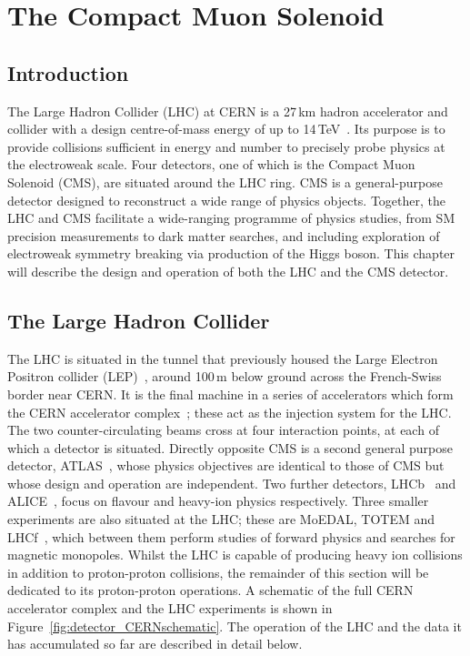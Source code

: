 \chapter{The Compact Muon Solenoid}
\label{chap:detector}

\section{Introduction}

The Large Hadron Collider (LHC) at CERN is a 27\,km hadron accelerator and collider with a design centre-of-mass energy of up to 14\,TeV~\cite{LHC}.
Its purpose is to provide collisions sufficient in energy and number to precisely probe physics at the electroweak scale.
Four detectors, one of which is the Compact Muon Solenoid (CMS), are situated around the LHC ring.
CMS is a general-purpose detector designed to reconstruct a wide range of physics objects.
Together, the LHC and CMS facilitate a wide-ranging programme of physics studies, from SM precision measurements to dark matter searches, 
and including exploration of electroweak symmetry breaking via production of the Higgs boson.
This chapter will describe the design and operation of both the LHC and the CMS detector.

\section{The Large Hadron Collider}

The LHC is situated in the tunnel that previously housed the Large Electron Positron collider (LEP)~\cite{LEP}, 
around 100\,m below ground across the French-Swiss border near CERN.
It is the final machine in a series of accelerators which form the CERN accelerator complex~\cite{CERNcomplex}; 
these  act as the injection system for the LHC.
The two counter-circulating beams cross at four interaction points, at each of which a detector is situated.
Directly opposite CMS is a second general purpose detector, ATLAS~\cite{ATLAS}, 
whose physics objectives are identical to those of CMS but whose design and operation are independent. 
Two further detectors, LHCb~\cite{LHCb} and ALICE~\cite{ALICE}, focus on flavour and heavy-ion physics respectively.
Three smaller experiments are also situated at the LHC; these are MoEDAL, TOTEM and LHCf~\cite{Moedal,TOTEM,LHCf}, 
which between them perform studies of forward physics and searches for magnetic monopoles.
Whilst the LHC is capable of producing heavy ion collisions in addition to proton-proton collisions, 
the remainder of this section will be dedicated to its proton-proton operations.
A schematic of the full CERN accelerator complex and the LHC experiments is shown in Figure~\ref{fig:detector_CERNschematic}.
The operation of the LHC and the data it has accumulated so far are described in detail below.


